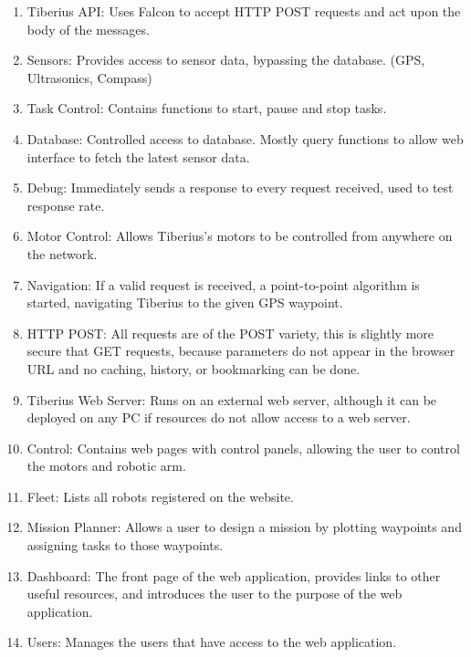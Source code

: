\begin{enumerate}[label=(\alph*)]
  \item Tiberius API: Uses Falcon to accept \gls{HTTP} \gls{POST} requests and act upon the body of the messages.  %
  
  \item Sensors: Provides access to sensor data, bypassing the database.  (GPS, Ultrasonics, Compass) %
  
  \item Task Control: Contains functions to start, pause and stop tasks. %
  
  \item Database: Controlled access to database. Mostly query functions to allow web interface to fetch the latest sensor data. %
  
  \item Debug: Immediately sends a response to every request received, used to test response rate. %
  
  \item Motor Control: Allows Tiberius's motors to be controlled from anywhere on the network. %
  
  \item Navigation: If a valid request is received, a point-to-point algorithm is started, navigating Tiberius to the given GPS waypoint. %
  
  \item HTTP POST: All requests are of the POST variety, this is slightly more secure that GET requests, because parameters do not appear in the browser URL and no caching, history, or bookmarking can be done.%
  
  \item Tiberius Web Server: Runs on an external web server, although it can be deployed on any PC if resources do not allow access to a web server. %
  
  \item Control: Contains web pages with control panels, allowing the user to control the motors and robotic arm. %
  \item Fleet: Lists all robots registered on the website. %
  \item Mission Planner: Allows a user to design a mission by plotting waypoints and assigning tasks to those waypoints. %
  \item Dashboard: The front page of the web application, provides links to other useful resources, and introduces the user to the purpose of the web application. %
  \item Users: Manages the users that have access to the web application. %
\end{enumerate}

